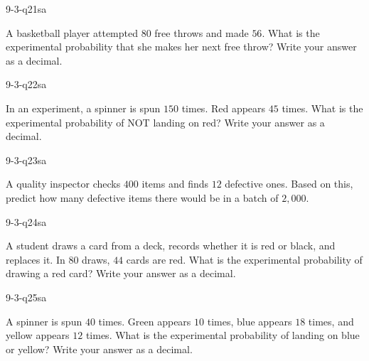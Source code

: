 \begin{practiceQuestion}{9-3-q21}{sa}
\begin{questionText}
A basketball player attempted $80$ free throws and made $56$. What is the experimental probability that she makes her next free throw? Write your answer as a decimal.
\end{questionText}
\end{practiceQuestion}

\begin{practiceQuestion}{9-3-q22}{sa}
\begin{questionText}
In an experiment, a spinner is spun $150$ times. Red appears $45$ times. What is the experimental probability of NOT landing on red? Write your answer as a decimal.
\end{questionText}
\end{practiceQuestion}

\begin{practiceQuestion}{9-3-q23}{sa}
\begin{questionText}
A quality inspector checks $400$ items and finds $12$ defective ones. Based on this, predict how many defective items there would be in a batch of $2{,}000$.
\end{questionText}
\end{practiceQuestion}

\begin{practiceQuestion}{9-3-q24}{sa}
\begin{questionText}
A student draws a card from a deck, records whether it is red or black, and replaces it. In $80$ draws, $44$ cards are red. What is the experimental probability of drawing a red card? Write your answer as a decimal.
\end{questionText}
\end{practiceQuestion}

\begin{practiceQuestion}{9-3-q25}{sa}
\begin{questionText}
A spinner is spun $40$ times. Green appears $10$ times, blue appears $18$ times, and yellow appears $12$ times. What is the experimental probability of landing on blue or yellow? Write your answer as a decimal.
\end{questionText}
\end{practiceQuestion}

